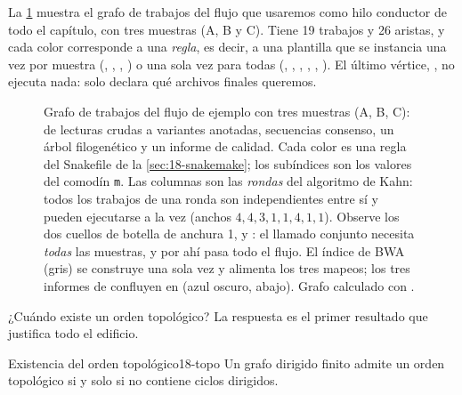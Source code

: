 \begin{simbolos}
\end{simbolos}

La \cref{fig:18-dag} muestra el grafo de trabajos del flujo que usaremos como hilo conductor de todo el capítulo, con tres muestras (A, B y C). Tiene 19 trabajos y 26 aristas, y cada color corresponde a una \emph{regla}, es decir, a una plantilla que se instancia una vez por muestra (, , , ) o una sola vez para todas (, , , , , ). El último vértice, , no ejecuta nada: solo declara qué archivos finales queremos.

\begin{figure}[t]
\centering
\begin{tikzpicture}[font=\sffamily\scriptsize]

\end{tikzpicture}
\caption[El grafo de trabajos del flujo de ejemplo]{Grafo de trabajos del flujo de ejemplo con tres muestras (A, B, C): de lecturas crudas a variantes anotadas, secuencias consenso, un árbol filogenético y un informe de calidad. Cada color es una regla del Snakefile de la \cref{sec:18-snakemake}; los subíndices son los valores del comodín \texttt{m}. Las columnas son las \emph{rondas} del algoritmo de Kahn: todos los trabajos de una ronda son independientes entre sí y pueden ejecutarse a la vez (anchos $4,4,3,1,1,4,1,1$). Observe los dos cuellos de botella de anchura 1,  y : el llamado conjunto necesita \emph{todas} las muestras, y por ahí pasa todo el flujo. El índice de BWA (gris) se construye una sola vez y alimenta los tres mapeos; los tres informes de  confluyen en  (azul oscuro, abajo). Grafo calculado con .}
\label{fig:18-dag}
\end{figure}

¿Cuándo existe un orden topológico? La respuesta es el primer resultado que justifica todo el edificio.

\begin{teorema}{Existencia del orden topológico}{18-topo}
Un grafo dirigido finito admite un orden topológico si y solo si no contiene ciclos dirigidos.
\end{teorema}

